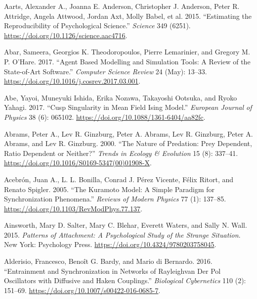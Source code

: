 \documentclass[
  letterpaper,
]{scrbook}
\newlength{\cslhangindent}
\newlength{\cslentryspacingunit} %
\newenvironment{CSLReferences}[2] %
 {%
  \setlength{\parindent}{0pt}
  \ifodd #1
  \let\oldpar\par
  \def\par{\hangindent=\cslhangindent\oldpar}
  \fi
  \setlength{\parskip}{#2\cslentryspacingunit}
 }%
 {}
\begin{document}
\hypertarget{refs}{}
\begin{CSLReferences}{1}{0}
\leavevmode{}%
Aarts, Alexander A., Joanna E. Anderson, Christopher J. Anderson, Peter
R. Attridge, Angela Attwood, Jordan Axt, Molly Babel, et al. 2015.
{``Estimating the Reproducibility of Psychological Science.''}
\emph{Science} 349 (6251).
\url{https://doi.org/10.1126/science.aac4716}.

\leavevmode{}%
Abar, Sameera, Georgios K. Theodoropoulos, Pierre Lemarinier, and
Gregory M. P. O'Hare. 2017. {``Agent {Based Modelling} and {Simulation}
Tools: {A} Review of the State-of-Art Software.''} \emph{Computer
Science Review} 24 (May): 13--33.
\url{https://doi.org/10.1016/j.cosrev.2017.03.001}.

\leavevmode{}%
Abe, Yayoi, Muneyuki Ishida, Erika Nozawa, Takayoshi Ootsuka, and Ryoko
Yahagi. 2017. {``Cusp Singularity in Mean Field {Ising} Model.''}
\emph{European Journal of Physics} 38 (6): 065102.
\url{https://doi.org/10.1088/1361-6404/aa82fc}.

\leavevmode{}%
Abrams, Peter A., Lev R. Ginzburg, Peter A. Abrams, Lev R. Ginzburg,
Peter A. Abrams, and Lev R. Ginzburg. 2000. {``The Nature of Predation:
Prey Dependent, Ratio Dependent or Neither?''} \emph{Trends in Ecology
\& Evolution} 15 (8): 337--41.
\url{https://doi.org/10.1016/S0169-5347(00)01908-X}.

\leavevmode{}%
Acebrón, Juan A., L. L. Bonilla, Conrad J. Pérez Vicente, Félix Ritort,
and Renato Spigler. 2005. {``The {Kuramoto} Model: {A} Simple Paradigm
for Synchronization Phenomena.''} \emph{Reviews of Modern Physics} 77
(1): 137--85. \url{https://doi.org/10.1103/RevModPhys.77.137}.

\leavevmode{}%
Ainsworth, Mary D. Salter, Mary C. Blehar, Everett Waters, and Sally N.
Wall. 2015. \emph{Patterns of {Attachment}: {A Psychological Study} of
the {Strange Situation}}. {New York}: {Psychology Press}.
\url{https://doi.org/10.4324/9780203758045}.

\leavevmode{}%
Alderisio, Francesco, Benoît G. Bardy, and Mario di Bernardo. 2016.
{``Entrainment and Synchronization in Networks of
{Rayleigh}\textendash van Der {Pol} Oscillators with Diffusive and
{Haken} Couplings.''}
\emph{Biological Cybernetics} 110 (2): 151--69.
\url{https://doi.org/10.1007/s00422-016-0685-7}.


\end{CSLReferences}
\end{document}
